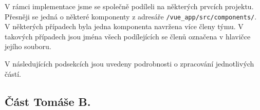 \documentclass[a4paper, 11pt]{article}
\renewcommand{\t}[1]{\texttt{#1}} %
\begin{document}
V rámci implementace jsme se společně podíleli na některých prvcích projektu.
Přesněji se jedná o některé komponenty z adresáře \t{/vue\_app/src/components/}.
V některých případech byla jedna komponenta navržena více členy týmu.
V takových případech jsou jména všech podílejících se členů označena
v hlavičce jejího souboru.

V následujících podsekcích jsou uvedeny podrobnosti o zpracování jednotlivých částí.






\subsection{Část Tomáše B.}
\end{document}
